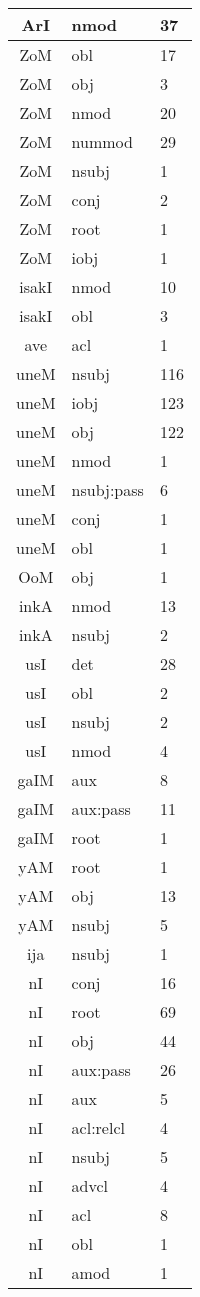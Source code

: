 \documentclass[a4 paper]{article}
\begin{document}
\begin{longtable}{cp{}p{}}
ArI & nmod & 37\\ \midrule 
ZoM & obl & 17\\ \midrule ZoM & obj & 3\\ \midrule ZoM & nmod & 20\\ \midrule ZoM & nummod & 29\\ \midrule ZoM & nsubj & 1\\ \midrule ZoM & conj & 2\\ \midrule ZoM & root & 1\\ \midrule ZoM & iobj & 1\\ \midrule 
isakI & nmod & 10\\ \midrule isakI & obl & 3\\ \midrule 
ave & acl & 1\\ \midrule 
uneM & nsubj & 116\\ \midrule uneM & iobj & 123\\ \midrule uneM & obj & 122\\ \midrule uneM & nmod & 1\\ \midrule uneM & nsubj:pass & 6\\ \midrule uneM & conj & 1\\ \midrule uneM & obl & 1\\ \midrule 
OoM & obj & 1\\ \midrule 
inkA & nmod & 13\\ \midrule inkA & nsubj & 2\\ \midrule 
usI & det & 28\\ \midrule usI & obl & 2\\ \midrule usI & nsubj & 2\\ \midrule usI & nmod & 4\\ \midrule 
gaIM & aux & 8\\ \midrule gaIM & aux:pass & 11\\ \midrule gaIM & root & 1\\ \midrule 
yAM & root & 1\\ \midrule yAM & obj & 13\\ \midrule yAM & nsubj & 5\\ \midrule 
ija & nsubj & 1\\ \midrule 
nI & conj & 16\\ \midrule nI & root & 69\\ \midrule nI & obj & 44\\ \midrule nI & aux:pass & 26\\ \midrule nI & aux & 5\\ \midrule nI & acl:relcl & 4\\ \midrule nI & nsubj & 5\\ \midrule nI & advcl & 4\\ \midrule nI & acl & 8\\ \midrule nI & obl & 1\\ \midrule nI & amod & 1\\ \midrule 

\end{longtable}
\end{document}
